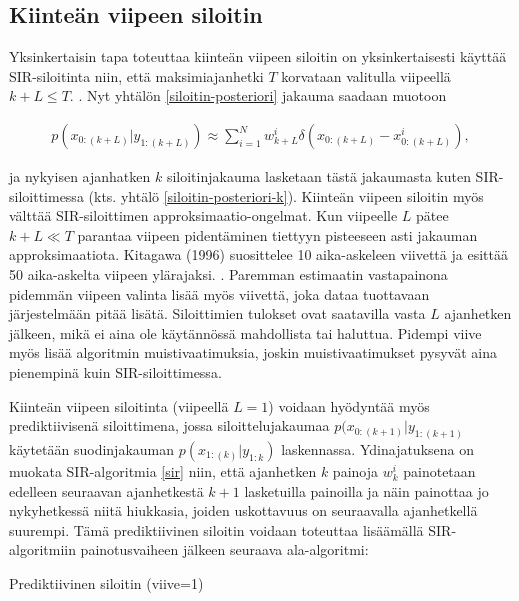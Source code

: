 \documentclass[
  12pt,
  a4paper, twoside]{book}
\begin{document}
\subsection{Kiinteän viipeen siloitin}

Yksinkertaisin tapa toteuttaa kiinteän viipeen siloitin on yksinkertaisesti käyttää SIR-siloitinta niin, että maksimiajanhetki \(T\) korvataan valitulla viipeellä \(k+L \le T\). \citep{kitagawa-1996}. Nyt yhtälön \ref{siloitin-posteriori} jakauma saadaan muotoon

\begin{align}\label{siloitin-posteriori-viive}
p(x_{0:(k+L)}|y_{1:(k+L)}) \approx \sum_{i=1}^N w_{k+L}^i \delta (x_{0:(k+L)}-x_{0:(k+L)}^i),
\end{align}

ja nykyisen ajanhatken \(k\) siloitinjakauma lasketaan tästä jakaumasta kuten SIR-siloittimessa (kts. yhtälö \ref{siloitin-posteriori-k}). Kiinteän viipeen siloitin myös välttää SIR-siloittimen approksimaatio-ongelmat. Kun viipeelle \(L\) pätee \(k+L \ll T\) parantaa viipeen pidentäminen tiettyyn pisteeseen asti jakauman approksimaatiota. Kitagawa (1996) suosittelee 10 aika-askeleen viivettä ja esittää 50 aika-askelta viipeen ylärajaksi. \citep{kitagawa-1996}. Paremman estimaatin vastapainona pidemmän viipeen valinta lisää myös viivettä, joka dataa tuottavaan järjestelmään pitää lisätä. Siloittimien tulokset ovat saatavilla vasta \(L\) ajanhetken jälkeen, mikä ei aina ole käytännössä mahdollista tai haluttua. Pidempi viive myös lisää algoritmin muistivaatimuksia, joskin muistivaatimukset pysyvät aina pienempinä kuin SIR-siloittimessa.

Kiinteän viipeen siloitinta (viipeellä \(L=1\)) voidaan hyödyntää myös prediktiivisenä siloittimena, jossa siloittelujakaumaa \(p(x_{0:(k+1)}|y_{1:(k+1)}\) käytetään suodinjakauman \(p(x_{1:(k)}|y_{1:k})\) laskennassa. \citep{Nyobe-2021} Ydinajatuksena on muokata SIR-algoritmia \ref{sir} niin, että ajanhetken \(k\) painoja \(w_k^i\) painotetaan edelleen seuraavan ajanhetkestä \(k+1\) lasketuilla painoilla ja näin painottaa jo nykyhetkessä niitä hiukkasia, joiden uskottavuus on seuraavalla ajanhetkellä suurempi. Tämä prediktiivinen siloitin voidaan toteuttaa lisäämällä SIR-algoritmiin painotusvaiheen jälkeen seuraava ala-algoritmi:

\begin{algorithm}[H]
\label{prediktiivinen-siloitin}
\DontPrintSemicolon
\SetAlgoShortEnd
{}
\caption{Prediktiivinen siloitin (viive=1)}
\end{algorithm}
\end{document}
